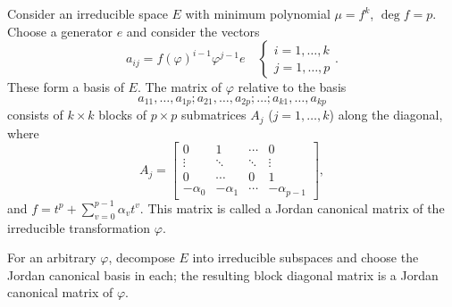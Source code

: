 Consider an irreducible space $E$ with minimum polynomial $\mu = f^k$, $\deg f = p$. Choose a generator $e$ and consider the vectors
$$a_{ij} = f(\varphi)^{i-1} \varphi^{j-1} e \quad \begin{cases} i = 1, \ldots, k \\ j = 1, \ldots, p \end{cases}.$$
These form a basis of $E$. The matrix of $\varphi$ relative to the basis
$$a_{11}, \ldots, a_{1p}; a_{21}, \ldots, a_{2p}; \ldots; a_{k1}, \ldots, a_{kp}$$
consists of $k \times k$ blocks of $p \times p$ submatrices $A_j$ ($j = 1, \ldots, k$) along the diagonal, where
$$A_j = \begin{bmatrix}
0 & 1 & \cdots & 0 \\
\vdots & \ddots & \ddots & \vdots \\
0 & \cdots & 0 & 1 \\
-\alpha_0 & -\alpha_1 & \cdots & -\alpha_{p-1}
\end{bmatrix},$$
and $f = t^p + \sum_{v=0}^{p-1} \alpha_v t^v$. This matrix is called a Jordan canonical matrix of the irreducible transformation $\varphi$.

For an arbitrary $\varphi$, decompose $E$ into irreducible subspaces and choose the Jordan canonical basis in each; the resulting block diagonal matrix is a Jordan canonical matrix of $\varphi$.
